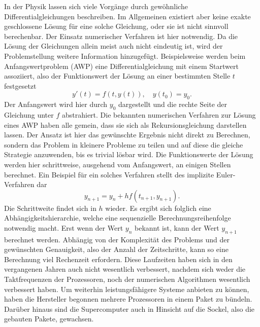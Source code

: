In der Physik lassen sich viele Vorgänge durch gewöhnliche Differentialgleichungen beschreiben. Im Allgemeinen existiert aber keine exakte geschlossene Lösung für eine solche Gleichung, oder sie ist nicht sinnvoll berechenbar. Der Einsatz numerischer Verfahren ist hier notwendig. Da die Lösung der Gleichungen allein meist auch nicht eindeutig ist, wird der Problemstellung weitere Information hinzugefügt. Beispielsweise werden beim Anfangswertproblem (AWP) eine Differentialgleichung mit einem Startwert assoziiert, also der Funktionswert der Lösung an einer bestimmten Stelle \(t\) festgesetzt
\begin{displaymath}
    y'(t) = f(t,y(t)), \quad y(t_0) = y_0.
\end{displaymath}
Der Anfangswert wird hier durch \(y_0\) dargestellt und die rechte Seite der Gleichung unter \(f\) abstrahiert. Die bekannten numerischen Verfahren zur Lösung eines AWP haben alle gemein, dass sie sich als Rekursionsgleichung darstellen lassen. Der Ansatz ist hier das gewünschte Ergebnis nicht direkt zu Berechnen, sondern das Problem in kleinere Probleme zu teilen und auf diese die gleiche Strategie anzuwenden, bis es trivial lösbar wird. Die Funktionswerte der Lösung werden hier schrittweise, ausgehend vom Anfangswert, an einigen Stellen berechnet. Ein Beispiel für ein solches Verfahren stellt des implizite Euler-Verfahren dar
\begin{displaymath}
    y_{n+1} = y_n + hf(t_{n+1},y_{n+1}).
\end{displaymath}
Die Schrittweite findet sich in \(h\) wieder. Es ergibt sich folglich eine Abhängig\-keits\-hierarchie, welche eine sequenzielle Berechnungsreihenfolge notwendig macht. Erst wenn der Wert \(y_n\) bekannt ist, kann der Wert \(y_{n+1}\) berechnet werden. Abhängig von der Komplexität des Problems und der gewünschten Genauigkeit, also der Anzahl der Zeitschritte, kann so eine Berechnung viel Rechenzeit erfordern. Diese Laufzeiten haben sich in den vergangenen Jahren auch nicht wesentlich verbessert, nachdem sich weder die Taktfrequenzen der Prozessoren, noch der numerischen Algorithmen wesentlich verbessert haben. Um weiterhin leistungsfähigere Systeme anbieten zu können, haben die Hersteller begonnen mehrere Prozessoren in einem Paket zu bündeln. Darüber hinaus sind die Supercomputer auch in Hinsicht auf die Sockel, also die gebauten Pakete, gewachsen.\\

